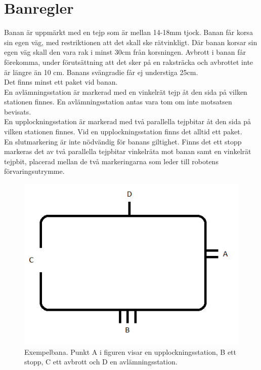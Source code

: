 \section{Banregler} \label{banregler}

Banan är uppmärkt med en tejp som är mellan 14-18mm tjock. Banan får korsa sin egen väg, med restriktionen att det skall ske rätvinkligt. Där banan korsar sin egen väg skall den vara rak i minst 30cm från korsningen. Avbrott i banan får förekomma, under förutsättning att det sker på en raksträcka och avbrottet inte är längre än 10 cm. Banans svängradie får ej understiga 25cm. \\
Det finns minst ett paket vid banan. \\
En avlämningsstation är markerad med en vinkelrät tejp åt den sida på vilken stationen finnes. En avlämningsstation antas vara tom om inte motsatsen bevisats. \\
En upplockningsstation är markerad med två parallella tejpbitar åt den sida på vilken stationen finnes. Vid en upplockningsstation finns det alltid ett paket. \\
En slutmarkering är inte nödvändig för banans giltighet. Finns det ett stopp markeras det av två parallella tejpbitar vinkelräta mot banan samt en vinkelrät tejpbit, placerad mellan de två markeringarna som leder till robotens förvaringsutrymme. \\

\begin{figure}[h]
\center
\includegraphics[]{figur.png}
\endcenter
\caption{Exempelbana. Punkt A i figuren visar en upplockningsstation, B ett stopp, C ett avbrott och D en avlämningsstation.}
\end{figure}